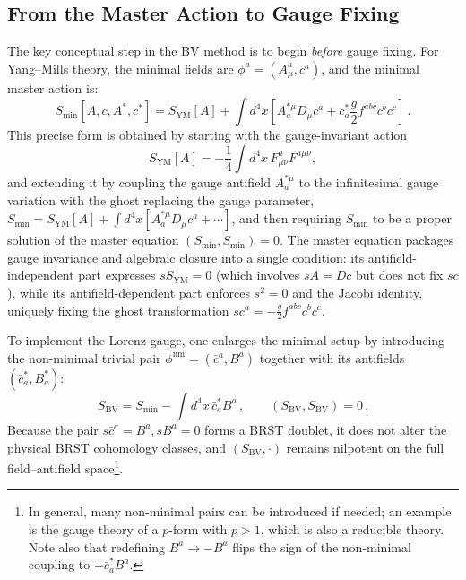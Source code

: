 \subsection{From the Master Action to Gauge Fixing}

The key conceptual step in the BV method is to begin \textit{before} gauge fixing. For Yang--Mills theory, the minimal fields are \(\phi^a = (A_\mu^a, c^a)\), and the minimal master action is:
\begin{equation} \label{eq:bv_ym_minimal_solution}
    S_{\text{min}}[A, c, A^*, c^*] = S_{\text{YM}}[A] + \int d^4x \left[ A_a^{*\mu} D_\mu c^a + c_a^* \frac{g}{2} f^{abc} c^b c^c \right] \, .
\end{equation}
This precise form is obtained by starting with the gauge-invariant action
\[
    S_{\text{YM}}[A] = -\frac{1}{4}\int d^4x \, F_{\mu\nu}^a F^{a\mu\nu},
\]
and extending it by coupling the gauge antifield \(A_a^{*\mu}\) to the infinitesimal gauge variation with the ghost replacing the gauge parameter, \(S_{\text{min}} = S_{\text{YM}}[A] + \int d^4x [A_a^{*\mu} D_\mu c^a + \cdots]\), and then requiring \(S_{\text{min}}\) to be a proper solution of the master equation \((S_{\text{min}}, S_{\text{min}}) = 0\). The master equation packages gauge invariance and algebraic closure into a single condition: its antifield-independent part expresses \(s S_{\text{YM}} = 0\) (which involves \(sA = Dc\) but does not fix \(sc\)), while its antifield-dependent part enforces \(s^2 = 0\) and the Jacobi identity, uniquely fixing the ghost transformation \(sc^a = -\frac{g}{2}f^{abc}c^b c^c\).

To implement the Lorenz gauge, one enlarges the minimal setup by introducing the non-minimal trivial pair \(\phi^{\text{nm}} = (\bar{c}^a, B^a)\) together with its antifields \((\bar{c}_a^*, B_a^*)\):
\begin{equation} \label{eq:bv_ym_nonminimal_solution}
    S_{\text{BV}} = S_{\text{min}} - \int d^4x \, \bar{c}_a^* B^a \, , \qquad (S_{\text{BV}}, S_{\text{BV}}) = 0 \, .
\end{equation}
Because the pair \(s\bar{c}^a = B^a, sB^a = 0\) forms a BRST doublet, it does not alter the physical BRST cohomology classes, and \((S_{\text{BV}}, \cdot)\) remains nilpotent on the full field--antifield space\footnote{In general, many non-minimal pairs can be introduced if needed; an example is the gauge theory of a \(p\)-form with \(p > 1\), which is also a reducible theory. Note also that redefining \(B^a \rightarrow -B^a\) flips the sign of the non-minimal coupling to \(+\bar{c}_a^* B^a\).}.

